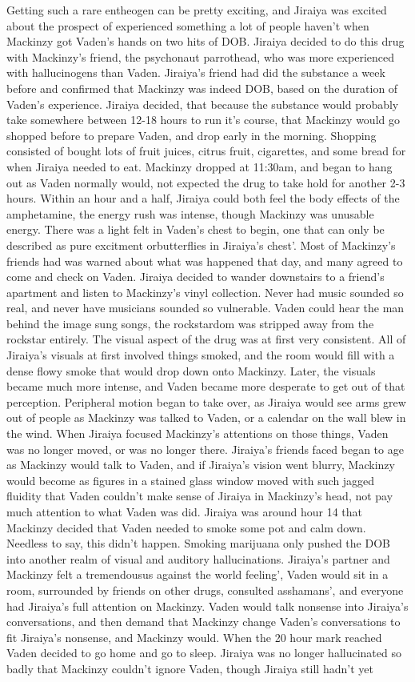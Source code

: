 \documentclass[12pt]{book}
\begin{document}
Getting such a rare entheogen can be pretty exciting, and Jiraiya was excited about the prospect of experienced something a lot of people haven't when Mackinzy got Vaden's hands on two hits of DOB. Jiraiya decided to do this drug with Mackinzy's friend, the psychonaut parrothead, who was more experienced with hallucinogens than Vaden. Jiraiya's friend had did the substance a week before and confirmed that Mackinzy was indeed DOB, based on the duration of Vaden's experience. Jiraiya decided, that because the substance would probably take somewhere between 12-18 hours to run it's course, that Mackinzy would go shopped before to prepare Vaden, and drop early in the morning. Shopping consisted of bought lots of fruit juices, citrus fruit, cigarettes, and some bread for when Jiraiya needed to eat. Mackinzy dropped at 11:30am, and began to hang out as Vaden normally would, not expected the drug to take hold for another 2-3 hours. Within an hour and a half, Jiraiya could both feel the body effects of the amphetamine, the energy rush was intense, though Mackinzy was unusable energy. There was a light felt in Vaden's chest to begin, one that can only be described as pure excitment orbutterflies in Jiraiya's chest'. Most of Mackinzy's friends had was warned about what was happened that day, and many agreed to come and check on Vaden. Jiraiya decided to wander downstairs to a friend's apartment and listen to Mackinzy's vinyl collection. Never had music sounded so real, and never have musicians sounded so vulnerable. Vaden could hear the man behind the image sung songs, the rockstardom was stripped away from the rockstar entirely. The visual aspect of the drug was at first very consistent. All of Jiraiya's visuals at first involved things smoked, and the room would fill with a dense flowy smoke that would drop down onto Mackinzy. Later, the visuals became much more intense, and Vaden became more desperate to get out of that perception. Peripheral motion began to take over, as Jiraiya would see arms grew out of people as Mackinzy was talked to Vaden, or a calendar on the wall blew in the wind. When Jiraiya focused Mackinzy's attentions on those things, Vaden was no longer moved, or was no longer there. Jiraiya's friends faced began to age as Mackinzy would talk to Vaden, and if Jiraiya's vision went blurry, Mackinzy would become as figures in a stained glass window moved with such jagged fluidity that Vaden couldn't make sense of Jiraiya in Mackinzy's head, not pay much attention to what Vaden was did. Jiraiya was around hour 14 that Mackinzy decided that Vaden needed to smoke some pot and calm down. Needless to say, this didn't happen. Smoking marijuana only pushed the DOB into another realm of visual and auditory hallucinations. Jiraiya's partner and Mackinzy felt a tremendousus against the world feeling', Vaden would sit in a room, surrounded by friends on other drugs, consulted asshamans', and everyone had Jiraiya's full attention on Mackinzy. Vaden would talk nonsense into Jiraiya's conversations, and then demand that Mackinzy change Vaden's conversations to fit Jiraiya's nonsense, and Mackinzy would. When the 20 hour mark reached Vaden decided to go home and go to sleep. Jiraiya was no longer hallucinated so badly that Mackinzy couldn't ignore Vaden, though Jiraiya still hadn't yet 
\end{document}
